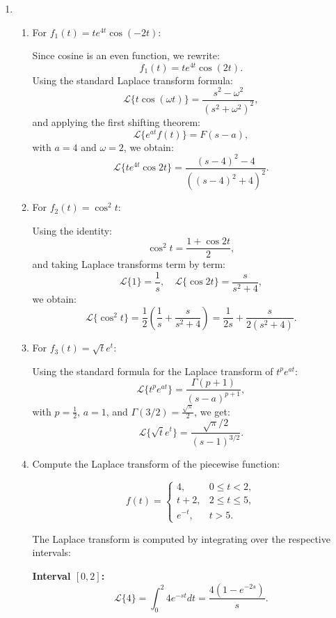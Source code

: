 \documentclass[12pt]{article}
\begin{document}
\begin{enumerate}
\item 
\begin{enumerate}

    \item For \( f_1(t) = t e^{4t} \cos(-2t) \):
    
    Since cosine is an even function, we rewrite:
    \[
    f_1(t) = t e^{4t} \cos(2t).
    \]
    Using the standard Laplace transform formula:
    \[
    \mathcal{L} \{t \cos(\omega t)\} = \frac{s^2 - \omega^2}{(s^2 + \omega^2)^2},
    \]
    and applying the first shifting theorem:
    \[
    \mathcal{L} \{e^{at} f(t) \} = F(s-a),
    \]
    with \( a = 4 \) and \( \omega = 2 \), we obtain:
    \[
    \mathcal{L} \{t e^{4t} \cos 2t \} = \frac{(s-4)^2 - 4}{\left( (s-4)^2 + 4 \right)^2}.
    \]

    \item For \( f_2(t) = \cos^2 t \):
    
    Using the identity:
    \[
    \cos^2 t = \frac{1 + \cos 2t}{2},
    \]
    and taking Laplace transforms term by term:
    \[
    \mathcal{L} \{ 1 \} = \frac{1}{s}, \quad \mathcal{L} \{\cos 2t\} = \frac{s}{s^2 + 4},
    \]
    we obtain:
    \[
    \mathcal{L} \{\cos^2 t\} = \frac{1}{2} \left( \frac{1}{s} + \frac{s}{s^2 + 4} \right) = \frac{1}{2s} + \frac{s}{2(s^2+4)}.
    \]

    \item For \( f_3(t) = \sqrt{t} e^t \):
    
    Using the standard formula for the Laplace transform of \( t^p e^{at} \):
    \[
    \mathcal{L} \{t^p e^{at} \} = \frac{\Gamma(p+1)}{(s-a)^{p+1}},
    \]
    with \( p = \frac{1}{2} \), \( a = 1 \), and \( \Gamma(3/2) = \frac{\sqrt{\pi}}{2} \), we get:
    \[
    \mathcal{L} \{\sqrt{t} e^t \} = \frac{\sqrt{\pi}/2}{(s-1)^{3/2}}.
    \]
    \item Compute the Laplace transform of the piecewise function:

    \[
    f(t) =
    \begin{cases}
    4, & 0 \leq t < 2, \\
    t+2, & 2 \leq t \leq 5, \\
    e^{-t}, & t > 5.
    \end{cases}
    \]

    The Laplace transform is computed by integrating over the respective intervals:

    \textbf{Interval \( [0,2] \):}
    \[
    \mathcal{L} \{4\} = \int_0^2 4 e^{-st} dt = \frac{4(1 - e^{-2s})}{s}.
    \]


\end{enumerate}
\end{enumerate}
\end{document}
